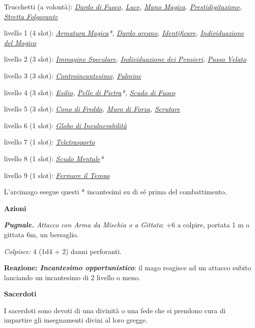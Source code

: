 \begin{multicols}{2}
{Trucchetti (a volontà): \emph{\hyperlink{Dardo di Fuoco}{Dardo di Fuoco}, \hyperlink{Luce}{Luce}, \hyperlink{Mano Magica}{Mano Magica}. \hyperlink{Prestidigitazione}{Prestidigitazione}, \hyperlink{Stretta Folgorante}{Stretta Folgorante}}

livello 1 (4 slot): \emph{\hyperlink{Armatura Magica}{Armatura Magica}*, \hyperlink{Dardo arcano}{Dardo arcano}, \hyperlink{Identificare}{Identificare}, \hyperlink{Individuazione del Magico}{Individuazione del Magico}}

livello 2 (3 slot): \emph{\hyperlink{Immagine Speculare}{Immagine Speculare}, \hyperlink{Individuazione dei Pensieri}{Individuazione dei Pensieri}, \hyperlink{Passo Velato}{Passo Velato}}

livello 3 (3 slot): \emph{\hyperlink{Controincantesimo}{Controincantesimo}, \hyperlink{Fulmine}{Fulmine}}

livello 4 (3 slot): \emph{\hyperlink{Esilio}{Esilio}, \hyperlink{Pelle di Pietra}{Pelle di Pietra}*, \hyperlink{Scudo di Fuoco}{Scudo di Fuoco}}

livello 5 (3 slot): \emph{\hyperlink{Cono di Freddo}{Cono di Freddo}, \hyperlink{Muro di Forza}{Muro di Forza}, \hyperlink{Scrutare}{Scrutare}}

livello 6 (1 slot): \emph{\hyperlink{Globo di Invulnerabilità}{Globo di Invulnerabilità}}

livello 7 (1 slot): \emph{\hyperlink{Teletrasporto}{Teletrasporto}}

livello 8 (1 slot): \emph{\hyperlink{Scudo Mentale}{Scudo Mentale}*}

livello 9 (1 slot): \emph{\hyperlink{Fermare il Tempo}{Fermare il Tempo}}

L'arcimago esegue questi * incantesimi su di sé prima del combattimento.

\textbf{Azioni}

\emph{\textbf{Pugnale.} Attacco con Arma da Mischia o a Gittata}: +6 a colpire, portata 1 m o gittata 6m, un bersaglio.

\emph{Colpisce:} 4 (1d4 + 2) danni perforanti.

\textbf{Reazione: \emph{Incantesimo opportunistico}}: il mago reagisce ad un attacco subito lanciando un incantesimo di 2 livello o meno.

\medskip\textbf{Sacerdoti}

I sacerdoti sono devoti di una divinità o una fede che si prendono cura di impartire gli insegnamenti divini al loro gregge.

}
\end{multicols}
